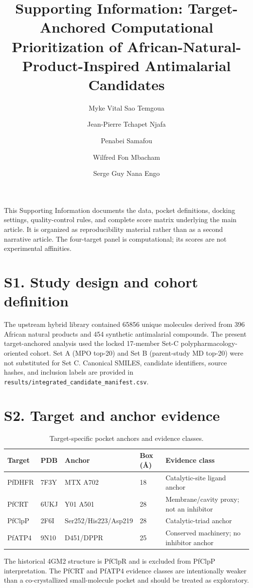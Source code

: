 \documentclass[journal=jcisd8,manuscript=suppinfo]{achemso}
\author{Myke Vital Sao Temgoua}
\author{Jean-Pierre Tchapet Njafa}
\author{Penabei Samafou}
\author{Wilfred Fon Mbacham}
\author{Serge Guy Nana Engo}
\title{Supporting Information: Target-Anchored Computational Prioritization of African-Natural-Product-Inspired Antimalarial Candidates}
\begin{document}
\noindent This Supporting Information documents the data, pocket definitions, docking settings, quality-control rules, and complete score matrix underlying the main article. It is organized as reproducibility material rather than as a second narrative article. The four-target panel is computational; its scores are not experimental affinities.

\section*{S1. Study design and cohort definition}
The upstream hybrid library contained \num{65856} unique molecules derived from \num{396} African natural products and \num{454} synthetic antimalarial compounds. The present target-anchored analysis used the locked 17-member Set-C polypharmacology-oriented cohort. Set A (MPO top-20) and Set B (parent-study MD top-20) were not substituted for Set C. Canonical SMILES, candidate identifiers, source hashes, and inclusion labels are provided in \texttt{results/integrated\_candidate\_manifest.csv}.

\section*{S2. Target and anchor evidence}
\begin{table}[h]
\centering
\caption{Target-specific pocket anchors and evidence classes.}
\label{tab:anchors}
\begin{tabular}{@{}llllp{5.3cm}@{}}
\toprule
Target & PDB & Anchor & Box (\si{\angstrom}) & Evidence class \\
\midrule
PfDHFR & 7F3Y & MTX A702 & 18 & Catalytic-site ligand anchor \\
PfCRT & 6UKJ & Y01 A501 & 28 & Membrane/cavity proxy; not an inhibitor \\
PfClpP & 2F6I & Ser252/His223/Asp219 & 28 & Catalytic-triad anchor \\
PfATP4 & 9N10 & D451/DPPR & 25 & Conserved machinery; no inhibitor anchor \\
\bottomrule
\end{tabular}
\end{table}

The historical 4GM2 structure is PfClpR and is excluded from PfClpP interpretation. The PfCRT and PfATP4 evidence classes are intentionally weaker than a co-crystallized small-molecule pocket and should be treated as exploratory.
\end{document}
